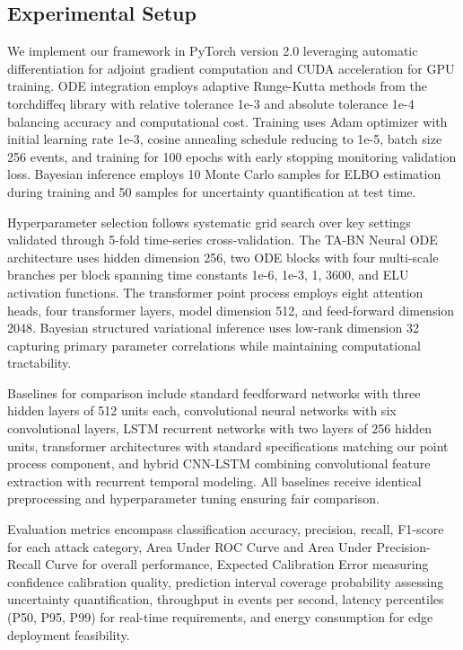 \documentclass[10pt,journal,compsoc]{IEEEtran}
\begin{document}
\subsection{Experimental Setup}

We implement our framework in PyTorch version 2.0 leveraging automatic differentiation for adjoint gradient computation and CUDA acceleration for GPU training. ODE integration employs adaptive Runge-Kutta methods from the torchdiffeq library with relative tolerance 1e-3 and absolute tolerance 1e-4 balancing accuracy and computational cost. Training uses Adam optimizer with initial learning rate 1e-3, cosine annealing schedule reducing to 1e-5, batch size 256 events, and training for 100 epochs with early stopping monitoring validation loss. Bayesian inference employs 10 Monte Carlo samples for ELBO estimation during training and 50 samples for uncertainty quantification at test time.

Hyperparameter selection follows systematic grid search over key settings validated through 5-fold time-series cross-validation. The TA-BN Neural ODE architecture uses hidden dimension 256, two ODE blocks with four multi-scale branches per block spanning time constants {1e-6, 1e-3, 1, 3600}, and ELU activation functions. The transformer point process employs eight attention heads, four transformer layers, model dimension 512, and feed-forward dimension 2048. Bayesian structured variational inference uses low-rank dimension 32 capturing primary parameter correlations while maintaining computational tractability.

Baselines for comparison include standard feedforward networks with three hidden layers of 512 units each, convolutional neural networks with six convolutional layers, LSTM recurrent networks with two layers of 256 hidden units, transformer architectures with standard specifications matching our point process component, and hybrid CNN-LSTM combining convolutional feature extraction with recurrent temporal modeling. All baselines receive identical preprocessing and hyperparameter tuning ensuring fair comparison.

Evaluation metrics encompass classification accuracy, precision, recall, F1-score for each attack category, Area Under ROC Curve and Area Under Precision-Recall Curve for overall performance, Expected Calibration Error measuring confidence calibration quality, prediction interval coverage probability assessing uncertainty quantification, throughput in events per second, latency percentiles (P50, P95, P99) for real-time requirements, and energy consumption for edge deployment feasibility.
\end{document}
